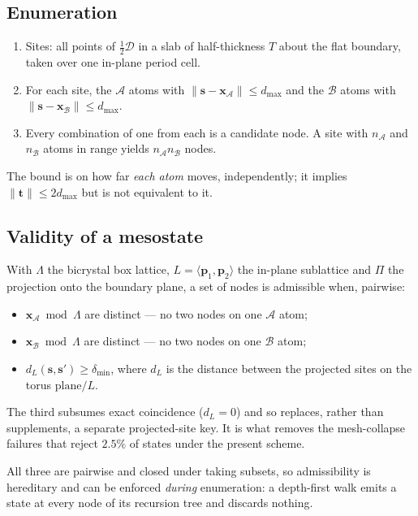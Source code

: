 \documentclass[11pt]{article}
\newcommand{\A}{\mathcal{A}}
\newcommand{\B}{\mathcal{B}}
\newcommand{\D}{\mathcal{D}}
\newcommand{\dmax}{d_{\max}}
\newcommand{\dmin}{\delta_{\min}}
\begin{document}
\subsection*{Enumeration}

\begin{enumerate}
  \item Sites: all points of $\tfrac{1}{2}\D$ in a slab of half-thickness $T$
        about the flat boundary, taken over one in-plane period cell.
  \item For each site, the $\A$ atoms with
        $\lVert \mathbf{s}-\mathbf{x}_\A \rVert \le \dmax$ and the $\B$ atoms
        with $\lVert \mathbf{s}-\mathbf{x}_\B \rVert \le \dmax$.
  \item Every combination of one from each is a candidate node. A site with
        $n_\A$ and $n_\B$ atoms in range yields $n_\A n_\B$ nodes.
\end{enumerate}
The bound is on how far \emph{each atom} moves, independently; it implies
$\lVert\mathbf{t}\rVert \le 2\dmax$ but is not equivalent to it.

\subsection*{Validity of a mesostate}

With $\Lambda$ the bicrystal box lattice, $L = \langle \mathbf{p}_1,
\mathbf{p}_2 \rangle$ the in-plane sublattice and $\Pi$ the projection onto the
boundary plane, a set of nodes is admissible when, pairwise:
\begin{itemize}
  \item $\mathbf{x}_\A \bmod \Lambda$ are distinct --- no two nodes on one $\A$ atom;
  \item $\mathbf{x}_\B \bmod \Lambda$ are distinct --- no two nodes on one $\B$ atom;
  \item $d_L(\mathbf{s},\mathbf{s}') \ge \dmin$, where $d_L$ is the distance
        between the projected sites on the torus $\text{plane}/L$.
\end{itemize}
The third subsumes exact coincidence ($d_L = 0$) and so replaces, rather than
supplements, a separate projected-site key. It is what removes the
mesh-collapse failures that reject $2.5\%$ of states under the present scheme.

All three are pairwise and closed under taking subsets, so admissibility is
hereditary and can be enforced \emph{during} enumeration: a depth-first walk
emits a state at every node of its recursion tree and discards nothing.
\end{document}
